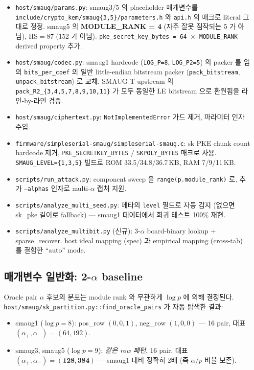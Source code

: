 \documentclass[11pt]{article}
\theoremstyle{plain}
\theoremstyle{definition}
\theoremstyle{remark}
\newcommand{\HS}{\mathrm{HS}}
\begin{document}
\begin{itemize}[leftmargin=*]
\item \texttt{host/smaug/params.py}: smaug3/5 의 placeholder 매개변수를
      \texttt{include/crypto\_kem/smaug\{3,5\}/parameters.h} 와
      \texttt{api.h} 의 매크로 literal 그대로 정정. smaug5 의
      \textbf{MODULE\_RANK = 4} (자주 잘못 짐작되는 5 가 아님), $\HS=87$
      (152 가 아님). \texttt{pke\_secret\_key\_bytes = 64 $\times$ MODULE\_RANK}
      derived property 추가.
\item \texttt{host/smaug/codec.py}: smaug1 hardcode (\texttt{LOG\_P=8},
      \texttt{LOG\_P2=5}) 의 packer 를 임의 \texttt{bits\_per\_coef} 의
      일반 little-endian bitstream packer (\texttt{pack\_bitstream},
      \texttt{unpack\_bitstream}) 로 교체. SMAUG-T upstream 의
      \texttt{pack\_R2\_\{3,4,5,7,8,9,10,11\}} 가 모두 동일한 LE bitstream
      으로 환원됨을 라인-by-라인 검증.
\item \texttt{host/smaug/ciphertext.py}: \texttt{NotImplementedError} 가드
      제거, 파라미터 인자 주입.
\item \texttt{firmware/simpleserial-smaug/simpleserial-smaug.c}: sk PKE chunk
      count hardcode 제거, \texttt{PKE\_SECRETKEY\_BYTES} / \texttt{SKPOLY\_BYTES}
      매크로 사용. \texttt{SMAUG\_LEVEL=\{1,3,5\}} 빌드로 ROM 33.5/34.8/36.7\,KB,
      RAM 7/9/11\,KB.
\item \texttt{scripts/run\_attack.py}: component sweep 을 \texttt{range(p.module\_rank)}
      로, 추가 \texttt{--alphas} 인자로 multi-$\alpha$ 캡처 지원.
\item \texttt{scripts/analyze\_multi\_seed.py}: 메타의 \texttt{level} 필드로
      자동 감지 (없으면 sk\_pke 길이로 fallback) — smaug1 데이터에서 회귀
      테스트 100\% 재현.
\item \texttt{scripts/analyze\_multibit.py} (신규): 3-$\alpha$ board-binary
      lookup + sparse\_recover. host ideal mapping (spec) 과 empirical
      mapping (cross-tab) 를 결합한 ``auto'' mode.
\end{itemize}

\subsection{매개변수 일반화: 2-$\alpha$ baseline}
\label{sec:ext-2alpha}

Oracle pair $\alpha$ 후보의 분포는 module rank 와 무관하게 $\log p$ 에 의해
결정된다. \texttt{host/smaug/sk\_partition.py::find\_oracle\_pairs} 가 자동
탐색한 결과:

\begin{itemize}[leftmargin=*]
\item smaug1 ($\log p = 8$): pos\_row $(0,0,1)$, neg\_row $(1,0,0)$ — 16 pair,
      대표 $(\alpha_+, \alpha_-) = (64, 192)$.
\item smaug3, smaug5 ($\log p = 9$): \emph{같은 row 패턴}, 16 pair,
      대표 $(\alpha_+, \alpha_-) = \mathbf{(128, 384)}$ — smaug1 대비
      정확히 2배 (즉 $\alpha / p$ 비율 보존).
\end{itemize}
\end{document}
